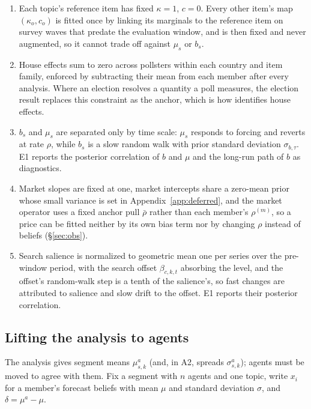 \documentclass[10pt]{article}
\theoremstyle{remark}
\begin{document}
\begin{enumerate}
\setlength\itemsep{1pt}
\item Each topic's reference item has fixed $\kappa=1$, $c=0$. Every other item's map $(\kappa_o,c_o)$ is fitted once by linking its marginals to the reference item on survey waves that predate the evaluation window, and is then fixed and never augmented, so it cannot trade off against $\mu_s$ or $b_s$.
\item House effects sum to zero across pollsters within each country and item family, enforced by subtracting their mean from each member after every analysis. Where an election resolves a quantity a poll measures, the election result replaces this constraint as the anchor, which is how \citet{jackman2005} identifies house effects.
\item $b_s$ and $\mu_s$ are separated only by time scale: $\mu_s$ responds to forcing and reverts at rate $\rho$, while $b_s$ is a slow random walk with prior standard deviation $\sigma_{b,\tau}$. E1 reports the posterior correlation of $b$ and $\mu$ and the long-run path of $b$ as diagnostics.
\item Market slopes are fixed at one, market intercepts share a zero-mean prior whose small variance is set in Appendix~\ref{app:deferred}, and the market operator uses a fixed anchor pull $\bar\rho$ rather than each member's $\rho^{(m)}$, so a price can be fitted neither by its own bias term nor by changing $\rho$ instead of beliefs (\S\ref{sec:obs}).
\item Search salience is normalized to geometric mean one per series over the pre-window period, with the search offset $\beta_{c,k,t}$ absorbing the level, and the offset's random-walk step is a tenth of the salience's, so fast changes are attributed to salience and slow drift to the offset. E1 reports their posterior correlation.
\end{enumerate}

\subsection{Lifting the analysis to agents}
\label{sec:lift}
The analysis gives segment means $\mu^a_{s,k}$ (and, in A2, spreads $\sigma^a_{s,k}$); agents must be moved to agree with them. Fix a segment with $n$ agents and one topic, write $x_i$ for a member's forecast beliefs with mean $\mu$ and standard deviation $\sigma$, and $\delta=\mu^a-\mu$.
\end{document}
